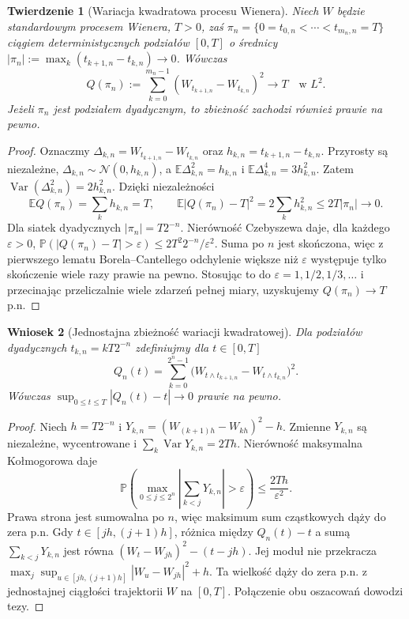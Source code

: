 \documentclass[11pt,a4paper,oneside]{report}
\numberwithin{equation}{chapter}
\theoremstyle{plain}
\newtheorem{twierdzenie}{Twierdzenie}[chapter]
\newtheorem{wniosek}[twierdzenie]{Wniosek}
\theoremstyle{definition}
\theoremstyle{remark}
\newcommand{\Prob}{\mathbb{P}}
\newcommand{\E}{\mathbb{E}}
\newcommand{\Var}{\operatorname{Var}}
\newcommand{\Normal}{\mathcal{N}}
\begin{document}
\begin{twierdzenie}[Wariacja kwadratowa procesu Wienera]
Niech $W$ będzie standardowym procesem Wienera, $T>0$, zaś
$\pi_n=\{0=t_{0,n}<\cdots<t_{m_n,n}=T\}$
ciągiem deterministycznych podziałów $[0,T]$ o średnicy
$|\pi_n|:=\max_k(t_{k+1,n}-t_{k,n})\to0$.
Wówczas
\[
Q(\pi_n):=\sum_{k=0}^{m_n-1}
(W_{t_{k+1,n}}-W_{t_{k,n}})^2
\longrightarrow T\quad\text{w }L^2.
\]
Jeżeli $\pi_n$ jest podziałem dyadycznym, to zbieżność
zachodzi również prawie na pewno.
\end{twierdzenie}
\begin{proof}
Oznaczmy $\Delta_{k,n}=W_{t_{k+1,n}}-W_{t_{k,n}}$
oraz $h_{k,n}=t_{k+1,n}-t_{k,n}$.
Przyrosty są niezależne, $\Delta_{k,n}\sim\Normal(0,h_{k,n})$,
a $\E\Delta_{k,n}^2=h_{k,n}$ i
$\E\Delta_{k,n}^4=3h_{k,n}^2$. Zatem
$\Var(\Delta_{k,n}^2)=2h_{k,n}^2$.
Dzięki niezależności
\[
\E Q(\pi_n)=\sum_k h_{k,n}=T,
\qquad
\E\bigl|Q(\pi_n)-T\bigr|^2
=2\sum_k h_{k,n}^2\le 2T|\pi_n|\to0.
\]
Dla siatek dyadycznych $|\pi_n|=T2^{-n}$.
Nierówność Czebyszewa daje, dla każdego $\varepsilon>0$,
$\Prob(|Q(\pi_n)-T|>\varepsilon)
\le 2T^2 2^{-n}/\varepsilon^2$.
Suma po $n$ jest skończona, więc z pierwszego lematu
Borela--Cantellego odchylenie większe niż $\varepsilon$
występuje tylko skończenie wiele razy prawie na pewno.
Stosując to do $\varepsilon=1,1/2,1/3,\ldots$
i przecinając przeliczalnie wiele zdarzeń pełnej miary,
uzyskujemy $Q(\pi_n)\to T$ p.n.
\end{proof}

\begin{wniosek}[Jednostajna zbieżność wariacji kwadratowej]
Dla podziałów dyadycznych $t_{k,n}=kT2^{-n}$
zdefiniujmy dla $t\in[0,T]$
\[
Q_n(t)=\sum_{k=0}^{2^n-1}
\bigl(W_{t\wedge t_{k+1,n}}-W_{t\wedge t_{k,n}}\bigr)^2.
\]
Wówczas $\sup_{0\le t\le T}|Q_n(t)-t|\to0$
prawie na pewno.
\end{wniosek}
\begin{proof}
Niech $h=T2^{-n}$ i
$Y_{k,n}=(W_{(k+1)h}-W_{kh})^2-h$.
Zmienne $Y_{k,n}$ są niezależne, wycentrowane i
$\sum_k\Var Y_{k,n}=2Th$.
Nierówność maksymalna Kołmogorowa daje
\[
\Prob\left(\max_{0\le j\le 2^n}
\left|\sum_{k<j}Y_{k,n}\right|>\varepsilon\right)
\le \frac{2Th}{\varepsilon^2}.
\]
Prawa strona jest sumowalna po $n$, więc maksimum
sum cząstkowych dąży do zera p.n. Gdy
$t\in[jh,(j+1)h]$, różnica między $Q_n(t)-t$
a sumą $\sum_{k<j}Y_{k,n}$ jest równa
$(W_t-W_{jh})^2-(t-jh)$. Jej moduł nie przekracza
$\max_j\sup_{u\in[jh,(j+1)h]}|W_u-W_{jh}|^2+h$.
Ta wielkość dąży do zera p.n. z jednostajnej
ciągłości trajektorii $W$ na $[0,T]$.
Połączenie obu oszacowań dowodzi tezy.
\end{proof}
\end{document}
